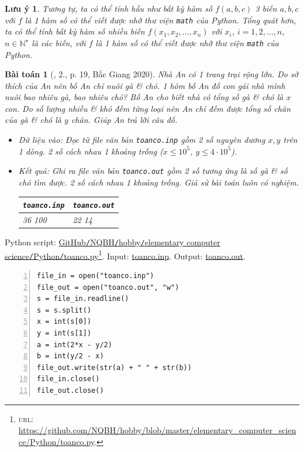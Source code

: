 \documentclass{article}
\newtheorem{baitoan}{Bài toán}
\newtheorem{luuy}{Lưu ý}
\begin{document}
\begin{luuy}
	Tương tự, ta có thể tính hầu như bất kỳ hàm số $f(a,b,c)$ 3 biến $a,b,c$ với $f$ là 1 hàm số có thể viết được nhờ thư viện {\tt math} của Python. Tổng quát hơn, ta có thể tính bất kỳ hàm số nhiều biến $f(x_1,x_2,\ldots,x_n)$ với $x_i$, $i = 1,2,\ldots,n$, $n\in\mathbb{N}^\star$ là các biến, với $f$ là 1 hàm số có thể viết được nhờ thư viện {\tt math} của Python.
\end{luuy}

\begin{baitoan}[\cite{VietSTEM2021}, 2., p. 19, Bắc Giang 2020]
	Nhà An có 1 trang trại rộng lớn. Do sở thích của An nên bố An chỉ nuôi gà \& chó. 1 hôm bố An đố con gái nhà mình nuôi bao nhiêu gà, bao nhiêu chó? Bố An cho biết nhà có tổng số gà \& chó là $x$ con. Do số lượng nhiều \& khó đếm từng loại nên An chỉ đếm được tổng số chân của gà \& chó là $y$ chân. Giúp An trả lời câu đố.
	\begin{itemize}
		\item {\sf Dữ liệu vào:} Đọc từ file văn bản \verb|toanco.inp| gồm 2 số nguyên dương $x,y$ trên 1 dòng. 2 số cách nhau 1 khoảng trống ($x\le10^5$, $y\le4\cdot10^5$).
		\item {\sf Kết quả:} Ghi ra file văn bản \verb|toanco.out| gồm 2 số tương ứng là số gà \& số chó tìm được. 2 số cách nhau 1 khoảng trống. Giả sử bài toán luôn có nghiệm.
		\begin{table}[H]
			\centering
			\begin{tabular}{|l|l|}
				\hline
				{\tt toanco.inp} & {\tt toanco.out} \\
				\hline
				36 100 & 22 14 \\
				\hline
			\end{tabular}
		\end{table}
	\end{itemize}
\end{baitoan}
Python script: \href{https://github.com/NQBH/hobby/blob/master/elementary_computer_science/Python/toanco.py}{GitHub{\tt /}NQBH{\tt /}hobby{\tt /}elementary computer science{\tt /}Python{\tt /}toanco.py}\footnote{\textsc{url}: \url{https://github.com/NQBH/hobby/blob/master/elementary_computer_science/Python/toanco.py}.}. Input: \href{https://github.com/NQBH/hobby/blob/master/elementary_computer_science/Python/toanco.inp}{toanco.inp}. Output: \href{https://github.com/NQBH/hobby/blob/master/elementary_computer_science/Python/toanco.out}{toanco.out}.
\begin{Verbatim}[numbers=left,xleftmargin=5mm]
file_in = open("toanco.inp")
file_out = open("toanco.out", "w")
s = file_in.readline()
s = s.split()
x = int(s[0])
y = int(s[1])
a = int(2*x - y/2)
b = int(y/2 - x)
file_out.write(str(a) + " " + str(b))
file_in.close()
file_out.close()
\end{Verbatim}
\end{document}
